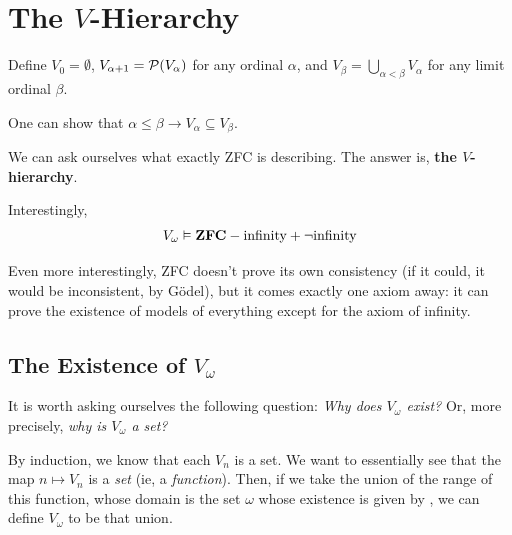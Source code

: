 \section{The $V$-Hierarchy}

\begin{boxdefinition}
    Define $V_0 = \emptyset$, $V_{\alpha + 1} = \mathcal{P}\!\left( V_{\alpha} \right)$ for any ordinal $\alpha$, and $V_{\beta} = \bigcup_{\alpha < \beta} V_{\alpha}$ for any limit ordinal $\beta$.
\end{boxdefinition}

One can show that $\alpha \le \beta \to V_{\alpha} \subseteq V_{\beta}$.

We can ask ourselves what exactly ZFC is describing. The answer is, \textbf{the $V$-hierarchy}.

Interestingly,
\begin{align*}
    V_{\omega} \vDash \mathbf{ZFC} - \text{infinity} + \neg \text{infinity}
\end{align*}

Even more interestingly, ZFC doesn't prove its own consistency (if it could, it would be inconsistent, by Gödel), but it comes exactly one axiom away: it can prove the existence of models of everything except for the axiom of infinity.



\subsection{The Existence of $V_{\omega}$}

It is worth asking ourselves the following question: \textit{Why does $V_{\omega}$ exist?} Or, more precisely, \textit{why is $V_{\omega}$ a set?}

By induction, we know that each $V_n$ is a set. We want to essentially see that the map $n \mapsto V_n$ is a \textit{set} (ie, a \textit{function}). Then, if we take the union of the range of this function, whose domain is the set $\omega$ whose existence is given by , we can define $V_{\omega}$ to be that union.


